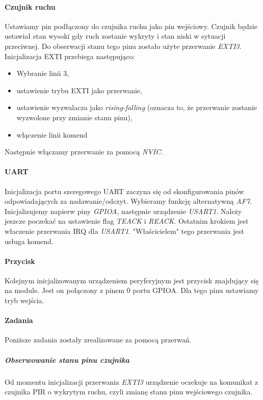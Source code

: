\documentclass{article}
\begin{document}
\paragraph{Czujnik ruchu}
Ustawiamy pin podłączony do czujnika ruchu jako pin wejściowy. Czujnik będzie ustawiał
stan wysoki gdy ruch zostanie wykryty i stan niski w sytuacji przeciwnej.
Do obserwacji stanu tego pinu zostało użyte przerwanie \emph{EXTI3}.
Inicjalizacja EXTI przebiega następująco:

\begin{itemize}
    \item Wybranie linii 3,
    \item ustawienie trybu EXTI jako przerwanie,
    \item ustawienie wyzwalacza jako \emph{rising-falling}
        (oznacza to, że przerwanie zostanie wyzwolone przy zmianie stanu pinu),
    \item włączenie linii komend
\end{itemize}
Następnie włączamy przerwanie za pomocą \emph{NVIC}.

\paragraph{UART}
Inicjalizacja portu szeregowego UART zaczyna się od skonfigurowania pinów
odpowiadających za nadawanie/odczyt. Wybieramy funkcję alternatywną \emph{AF7}.
Inicjalizujemy napierw piny \emph{GPIOA}, następnie urządzenie \emph{USART1}.
Należy jeszcze poczekać na ustawienie flag \emph{TEACK} i \emph{REACK}. Ostatnim krokiem
jest właczenie przerwania IRQ dla \emph{USART1}. "Właścicielem" tego przerwania jest usługa komend.


\paragraph{Przycisk}
Kolejnym inicjalizowanym urządzeniem peryferyjnym jest przycisk znajdujący
się na module. Jest on połączony z pinem 0 portu GPIOA. Dla tego pinu ustawiamy tryb
wejścia.

\paragraph{Zadania}
Poniższe zadania zostały zrealizowane za pomocą przerwań.

\subparagraph{Obserwowanie stanu pinu czujnika}
Od momentu inicjalizacji przerwania \emph{EXTI3} urządzenie oczekuje na
komunikat z czujnika PIR o wykrytym ruchu, czyli zmianę stanu pinu wejściowego
czujnika.
\end{document}
